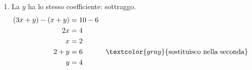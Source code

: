 \begin{question}[ID=1.1, subtitle={Sistemi lineari di due equazioni}, difficulty=facile, tags={sistemi, equazioni lineari}]
\begin{explanation}
\begin{enumerate}
\[\begin{aligned}
    x-2 &= 2 && \textcolor{gray}{\text{sostituisco nella seconda}}\\
    x &= 4
    \end{aligned}\]
    \item La $y$ ha lo stesso coefficiente: sottraggo.
    \[\begin{aligned}
    (3x+y)-(x+y) &= 10-6\\
    2x &= 4\\
    x &= 2\\
    2+y &= 6 && \textcolor{gray}{\text{sostituisco nella seconda}}\\
    y &= 4
    \end{aligned}\]
\end{enumerate}
\end{explanation}
\end{question}



